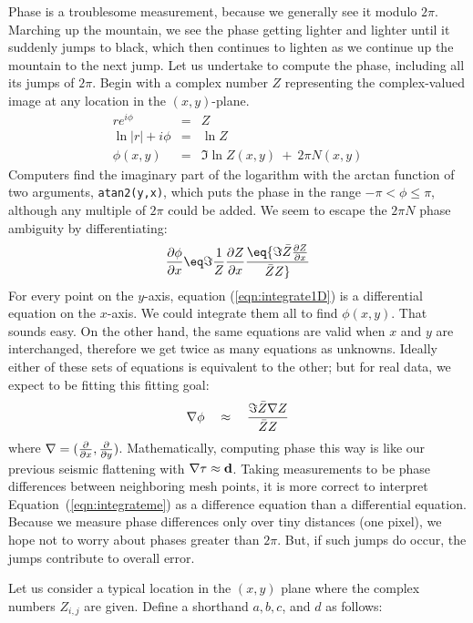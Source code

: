 \par
Phase is a troublesome measurement, because
we generally see it modulo $2\pi$.
Marching up the mountain, we see the phase getting lighter and lighter
until it suddenly jumps to black, which then continues to lighten
as we continue up the mountain to the next jump.
Let us undertake to compute the phase, including
all its jumps of $2\pi$.
Begin with a complex number $Z$ representing
the complex-valued image at any location
in the $(x,y)$-plane.
\begin{eqnarray}
r e^{i \phi}   &=& Z \\
\ln |r| + i \phi &=& \ln Z \\
\phi(x,y)            &=&  \Im \ln Z(x,y) ~+~  2\pi N(x,y)
\end{eqnarray}
Computers find the imaginary part of the logarithm
with the arctan function of two arguments, {\tt atan2(y,x)},
which puts the phase in the range $-\pi < \phi \le \pi$,
although any multiple of $2\pi$ could be added.
We seem to escape the $2\pi N$ phase ambiguity by differentiating:
\begin{eqnarray}
{\partial\phi \over \partial x} \eq \Im {1 \over Z}{\partial Z \over \partial x} \eq
                                   {\Im  \bar Z {\partial Z \over \partial x} \over \bar Z Z }
\label{eqn:integrate1D}
\end{eqnarray}
For every point on the $y$-axis, equation (\ref{eqn:integrate1D})
is a differential equation on the $x$-axis.
We could integrate them all to find $\phi(x,y)$.
That sounds easy.
On the other hand,
the same equations are valid when $x$ and $y$ are interchanged,
therefore we get twice as many equations as unknowns.
Ideally either of these sets of equations
is equivalent to the other;
but for real data, we expect to be fitting this fitting goal:
\begin{equation}
\nabla \phi \quad \approx \quad {\Im  \bar Z \nabla Z \over \bar Z Z}
\label{eqn:integrateme}
\end{equation}
where
$\nabla = ({\partial \over \partial x}, {\partial \over \partial y} ) $.
Mathematically, computing phase this way
is like our previous seismic flattening with
$\nabla \tau \approx {\bf d}$.
Taking measurements to be phase differences 
between neighboring mesh points,
it is more correct to interpret Equation~(\ref{eqn:integrateme}) as 
a difference equation than a differential equation.
Because we measure phase differences only over tiny distances (one pixel),
we hope not to worry about phases greater than $2\pi$.
But, if such jumps do occur, the jumps contribute to overall error.
\par
Let us consider a typical location in the $(x , y )$ plane where the complex numbers
$Z_{i,j}$ are given. Define a shorthand $a , b, c$, and $d$ as follows: 

